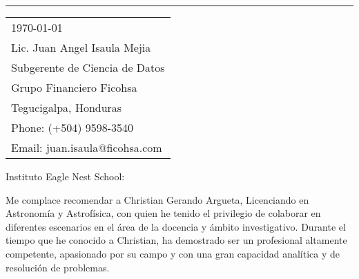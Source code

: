 \documentclass{article}
\begin{document}


\vspace{-1em} %

\rule{\linewidth}{1pt} %

\bigskip\bigskip %


\begin{tabular}{l @{}}
	\today \bigskip\\ %
	  Lic. Juan Angel Isaula Mejia\\
        Subgerente de Ciencia de Datos\\
        Grupo Financiero Ficohsa\\
	Tegucigalpa, Honduras \\ 
	Phone: (+504) 9598-3540 \\
	Email: juan.isaula@ficohsa.com
\end{tabular}

\bigskip %

\bigskip %

Instituto Eagle Nest School:

\bigskip %


Me complace recomendar a Christian Gerando Argueta, Licenciando en Astronomía y Astrofísica, con quien he tenido el privilegio de colaborar en diferentes escenarios en el área de la docencia y ámbito investigativo. Durante el tiempo que he conocido a Christian, ha demostrado ser un profesional altamente competente, apasionado por su campo y con una gran capacidad analítica y de resolución de problemas.
\end{document}
